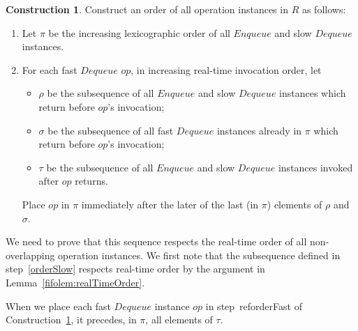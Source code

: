 \documentclass[a4paper,anonymous,USenglish]{lipics-v2021} %
\theoremstyle{definition}
\newtheorem{construction}{Construction}
\begin{document}
\begin{construction}\label{constr:relaxed}
  Construct an order of all operation instances in $R$ as follows:
  \begin{enumerate}
  \item Let $\pi$ be the increasing lexicographic order of all $Enqueue$ and slow $Dequeue$ instances. \label{orderSlow}
  \item For each fast $Dequeue$ $op$, in increasing real-time invocation order, let
    \begin{itemize}
    \item $\rho$ be the subsequence of all $Enqueue$ and slow $Dequeue$ instances which return before $op$'s invocation;
    \item $\sigma$ be the subsequence of all fast $Dequeue$ instances already in $\pi$ which return before $op$'s invocation;
    \item $\tau$ be the subsequence of all $Enqueue$ and slow $Dequeue$ instances invoked after $op$ returns.
    \end{itemize}
    Place $op$ in $\pi$ immediately after the later of the last (in $\pi$) elements of $\rho$ and $\sigma$.\label{orderFast}
  \end{enumerate}
\end{construction}


We need to prove that this sequence respects the real-time order of all non-overlapping operation instances.  We first note that the subsequence defined in step~\ref{orderSlow} respects real-time order by the argument in Lemma~\ref{fifolem:realTimeOrder}.

\begin{lemma}\label{ooolem:fastDeqOrdering}
  When we place each fast $Dequeue$ instance $op$ in step~ref{orderFast} of Construction~\ref{constr:relaxed}, it precedes, in $\pi$, all elements of $\tau$.
\end{lemma}
\end{document}
